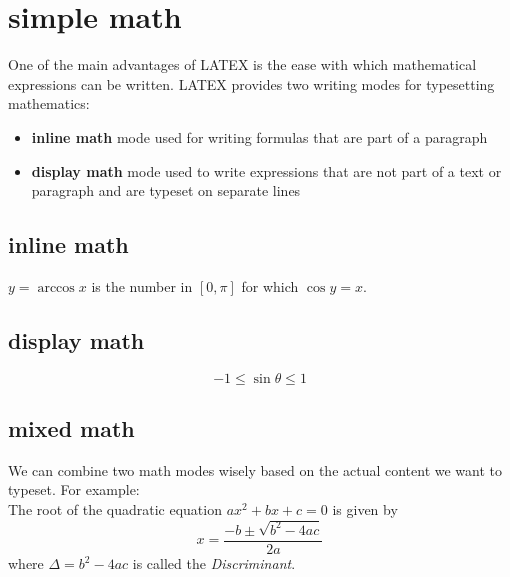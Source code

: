 \documentclass{article}
\begin{document}
	\section{simple math}
	
	One of the main advantages of LATEX is the ease with which mathematical expressions can be written. LATEX provides two writing modes for typesetting mathematics:
	\begin{itemize}
		\item \textbf{inline math} mode used for writing formulas that are part of a paragraph
		\item \textbf{display math} mode used to write expressions that are not part of a text or paragraph and are typeset on separate lines
	\end{itemize}
	
	\subsection{inline math}
	
	$y = \arccos x$ is the number in \([0,\pi]\) for which $\cos y = x$.
	
	\subsection{display math}
	
	$$ -1 \leq \sin \theta \leq 1 $$
	
	\subsection{mixed math}
	We can combine two math modes wisely based on the actual content we want to typeset. For example:\\
	
	The root of the quadratic equation \( ax^2 + bx + c = 0\) is given by \[ x = \frac{-b \pm \sqrt{b^2 - 4ac}}{2a}\] where $\Delta = b^2 - 4ac$ is called the \textit{Discriminant}.
	
	
\end{document}

